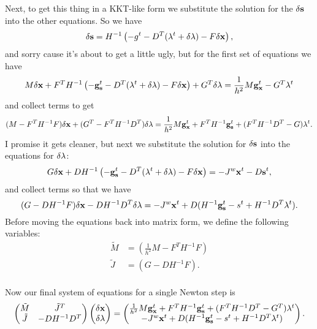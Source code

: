 Next, to get this thing in a KKT-like form we substitute the solution for the $\delta \mathbf{s}$ into the other equations. So we have
\begin{equation}
\delta \mathbf{s} = H^{-1}\left(-g^t - D^T(\mathbf{\lambda}^t + \delta \mathbf{\lambda}) - F\delta \mathbf{x} \right),
\end{equation}
and sorry cause it's about to get a little ugly, but for the first set of equations we have
\begin{equation*}
M\delta \mathbf{x} + F^TH^{-1}\left(-{\mathbf{g}_{\mathbf{s}}^t} - D^T(\mathbf{\lambda}^t + \delta \mathbf{\lambda}) - F\delta \mathbf{x} \right) +G^T \delta \mathbf{\lambda} = \frac{1}{h^2}M{\mathbf{g}_{\mathbf{x}}^t} - G^T\mathbf{\lambda}^t
\end{equation*}
and collect terms to get
\begin{equation}
(M - F^TH^{-1}F)\delta \mathbf{x} + (G^T - F^TH^{-1}D^T)\delta \mathbf{\lambda} = 
\frac{1}{h^2}M{\mathbf{g}_{\mathbf{x}}^t} + F^TH^{-1}{\mathbf{g}_{\mathbf{s}}^t} + (F^TH^{-1}D^T - G)\mathbf{\lambda}^t.
\end{equation}
I promise it gets cleaner, but next we substitute the solution for $\delta \mathbf{s}$ into the equations for $\delta \mathbf{\lambda}$:
\begin{equation*}
G\delta \mathbf{x} + DH^{-1}\left(-{\mathbf{g}_{\mathbf{s}}^t} - D^T(\mathbf{\lambda}^t + \delta \mathbf{\lambda}) - F\delta \mathbf{x}\right) = -J^w\mathbf{x}^t - D\mathbf{s}^t,
\end{equation*}
and collect terms so that we have
\begin{equation}
(G - DH^{-1}F)\delta \mathbf{x} - DH^{-1}D^T\delta \mathbf{\lambda} = -J^w\mathbf{x}^t + D(H^{-1}{\mathbf{g}_{\mathbf{s}}^t} - s^t + H^{-1}D^T\mathbf{\lambda}^t).
\end{equation}
Before moving the equations back into matrix form, we define the following variables:
\begin{align*}
\tilde{M} &= (\frac{1}{h^2}M - F^TH^{-1}F) \\
\tilde{J} &= (G - DH^{-1}F). \\
\end{align*}

Now our final system of equations for a single Newton step is
\begin{equation}
\begin{pmatrix}
\tilde{M} & \tilde{J}^T \\
\tilde{J} & -DH^{-1}D^T 
\end{pmatrix}
\begin{pmatrix}
\delta \mathbf{x} \\
\delta \mathbf{\lambda}
\end{pmatrix} =
\begin{pmatrix}
\frac{1}{h^2}M{\mathbf{g}_{\mathbf{x}}^t} + F^TH^{-1}{\mathbf{g}_{\mathbf{s}}^t} + (F^TH^{-1}D^T - G^T)\mathbf{\lambda}^t \\
-J^w\mathbf{x}^t + D(H^{-1}{\mathbf{g}_{\mathbf{s}}^t} - s^t + H^{-1}D^T\mathbf{\lambda}^t)
\end{pmatrix}.
\end{equation}